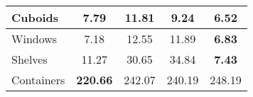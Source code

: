 \begin{table}[]
{\begin{tabular}{l|cl|cl|cl|cl|}
\multicolumn{1}{|l|}{Cuboids}    & \multicolumn{2}{c|}{7.79}            & \multicolumn{2}{c|}{11.81}  & \multicolumn{2}{c|}{9.24}   & \multicolumn{2}{c|}{\textbf{6.52}} \\ \hline
\multicolumn{1}{|l|}{Windows}    & \multicolumn{2}{c|}{7.18}            & \multicolumn{2}{c|}{12.55}  & \multicolumn{2}{c|}{11.89}  & \multicolumn{2}{c|}{\textbf{6.83}} \\ \hline
\multicolumn{1}{|l|}{Shelves}    & \multicolumn{2}{c|}{11.27}           & \multicolumn{2}{c|}{30.65}  & \multicolumn{2}{c|}{34.84}  & \multicolumn{2}{c|}{\textbf{7.43}} \\ \hline
\multicolumn{1}{|l|}{Containers} & \multicolumn{2}{c|}{\textbf{220.66}} & \multicolumn{2}{c|}{242.07} & \multicolumn{2}{c|}{240.19} & \multicolumn{2}{c|}{248.19}        \\ \hline
\end{tabular}%
}
\end{table}